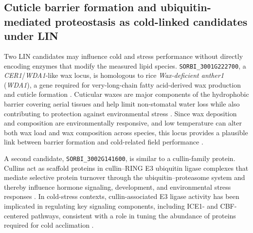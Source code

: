 \documentclass[9pt,twocolumn,twoside]{rilabRxiv}
\begin{document}



\subsection{Cuticle barrier formation and ubiquitin-mediated proteostasis as cold-linked candidates under LIN}

Two LIN candidates may influence cold and stress performance without directly encoding enzymes that modify the measured lipid species. \texttt{SORBI\_3001G222700}, a \textit{CER1}/\textit{WDA1}-like wax locus, is homologous to rice \textit{Wax-deficient anther1} (\textit{WDA1}), a gene required for very-long-chain fatty acid-derived wax production and cuticle formation \citep{Jung2006WDA1,Gladman2022SorghumBase}. Cuticular waxes are major components of the hydrophobic barrier covering aerial tissues and help limit non-stomatal water loss while also contributing to protection against environmental stress \citep{Jung2006WDA1,LeeSuh2022}. Since wax deposition and composition are environmentally responsive, and low temperature can alter both wax load and wax composition across species, this locus provides a plausible link between barrier formation and cold-related field performance \citep{LeeSuh2022}.

A second candidate, \texttt{SORBI\_3002G141600}, is similar to a cullin-family protein. Cullins act as scaffold proteins in cullin--RING E3 ubiquitin ligase complexes that mediate selective protein turnover through the ubiquitin--proteasome system and thereby influence hormone signaling, development, and environmental stress responses \citep{WangXie2024Cullin}. In cold-stress contexts, cullin-associated E3 ligase activity has been implicated in regulating key signaling components, including ICE1- and CBF-centered pathways, consistent with a role in tuning the abundance of proteins required for cold acclimation \citep{WangXie2024Cullin}.
\end{document}
